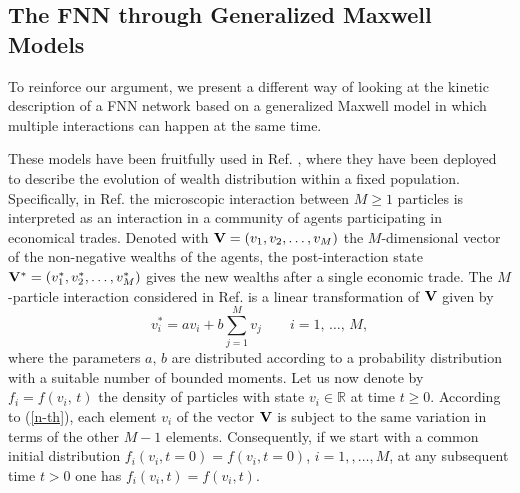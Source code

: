 \documentclass{article}
\renewcommand{\geq}{\geqslant}
\renewcommand{\ge}{\geqslant}
\newcommand{\fer}[1]{(\ref{#1})}
\newcommand{\R}{\mathbb R}
\def\R{\mathbb{R}}
\def\bV{{\bf V}}
\begin{document}
% 




\subsection{The FNN through Generalized Maxwell Models}

% 
To reinforce our argument, we present a different way of looking at the kinetic description of a FNN network based on a generalized Maxwell model in which multiple interactions can happen at the same time.
%

% 
These models have been fruitfully used in Ref. \cite{BCG}, where they have been deployed to describe the evolution of wealth distribution within a fixed population.
% 
% 
% 
Specifically, in Ref. \cite{BCG} the microscopic interaction between $M\ge 1$ particles is interpreted as an interaction in a community of agents participating in economical trades.
% 
Denoted with $\bV= (v_1,v_2,\dots, v_M)$ the $M$-dimensional vector of the non-negative wealths of the agents, the post-interaction state $\bV^\ast= (v_1^*,v_2^*,\dots, v_M^*)$ gives the new wealths after a single economic trade. 
% 
The $M$-particle interaction considered in Ref. \cite{BCG} is a linear transformation of $\bV$ given by
% 
\begin{equation}
    \label{n-th}
    v_i^\ast=av_i+b \sum_{j=1}^{M}v_j \qquad i=1,\,\dots,\,M,
\end{equation}
% 
where the parameters $a,\,b$ are distributed according to a probability distribution with a suitable number of bounded moments. 
% 
Let us now denote by $f_i=f(v_i,\,t)$ the density of particles with state $v_i\in\R$ at time $t\geq 0$. 
% 
According to \fer{n-th}, each element $v_i$ of the vector $\bV$ is subject to the same variation in terms of the other $M-1$ elements.
% 
Consequently, if we start with a common initial distribution $f_i(v_i, t=0) = f(v_i, t=0)$, $i = 1,,\dots, M$, at any subsequent time $ t >0$ one has $f_i(v_i, t) = f(v_i, t)$.
% 
\end{document}
